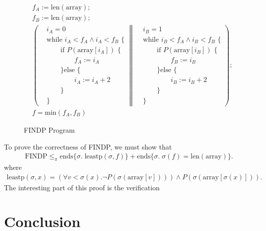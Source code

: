 \documentclass{llncs}
\begin{document}
\begin{figure}
\[
\begin{aligned}
&f_A := \text{len}(\text{array});\\
&f_B := \text{len}(\text{array});\\
&\left(
\begin{aligned}
&i_A = 0\\
&\text{while } i_A < f_A \land i_A < f_B \text{ \{ }\\
&\qquad\text{if } P(\text{array}[i_A]) \text{ \{}\\
&\qquad\qquad f_A := i_A\\
&\qquad\text{\} else \{}\\
&\qquad\qquad i_A := i_A + 2\\
&\qquad\text{\}}\\
&\text{\}}
\end{aligned}
\middle\|
\begin{aligned}
&i_B = 1\\
&\text{while } i_B < f_A \land i_B < f_B \text{ \{}\\
&\qquad\text{if } P(\text{array}[i_B]) \text{ \{}\\
&\qquad\qquad f_B := i_B\\
&\qquad\text{\} else \{}\\
&\qquad\qquad i_B := i_B + 2\\
&\qquad\text{\}}\\
&\text{\}}
\end{aligned}
\right);\\
&f = \text{min}(f_A,f_B)
\end{aligned}
\]
\caption{FINDP Program}
\label{fig:findp}
\end{figure}

To prove the correctness of FINDP, we must show that
\begin{align*}
\text{FINDP} \le_\pi \text{ends}\{\sigma.\; \text{leastp}(\sigma, f)\} + \text{ends}\{\sigma.\; \sigma(f) = \text{len}(\text{array})\}.
\end{align*}
where
\begin{align*}
\text{leastp}(\sigma, x) =  (\forall v<\sigma(x). \lnot P(\sigma(\text{array}[v])))\land P(\sigma(\text{array}[\sigma(x)])).
\end{align*}
The interesting part of this proof is the verification 

\newpage
\section{Conclusion}

{}

\end{document}
